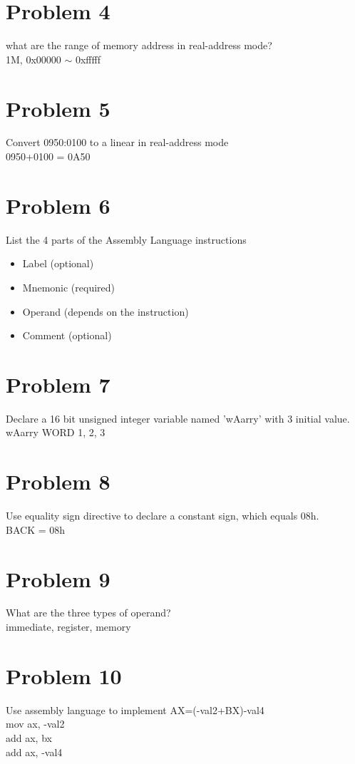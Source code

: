 \documentclass[paper=a4, fontsize=11pt]{scrartcl} %
\numberwithin{equation}{section} %
\numberwithin{figure}{section} %
\numberwithin{table}{section} %
\begin{document}
\section{Problem 4}
what are the range of memory address in real-address mode? \\
1M, 0x00000 $\sim$ 0xfffff\\

\section*{Problem 5}
Convert 0950:0100 to a linear in real-address mode\\
0950+0100 = 0A50 \\

\section{Problem 6}
List the 4 parts of the Assembly Language instructions\\
\begin{itemize}
 \item Label (optional)
 \item Mnemonic (required)
 \item Operand (depends on the instruction)
 \item Comment (optional)
\end{itemize}

\section{Problem 7}
Declare a 16 bit unsigned integer variable named 'wAarry' with 3 initial value.\\
wAarry WORD 1, 2, 3

\section{Problem 8}
Use equality sign directive to declare a constant sign, which equals 08h.\\
BACK = 08h

\section{Problem 9}
What are the three types of operand?\\
immediate, register, memory

\section{Problem 10}
Use assembly language to implement AX=(-val2+BX)-val4 \\
mov ax, -val2 \\
add ax, bx \\
add ax, -val4\\
\end{document}
